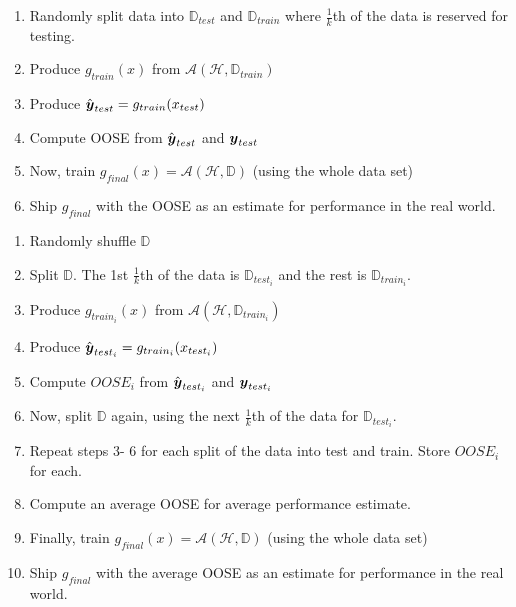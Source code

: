 \documentclass[12pt]{article}
\begin{document}


\begin{enumerate}


\begin{enumerate}[1.]
\item Randomly split data into $\mathbb{D}_{test}$ and $\mathbb{D}_{train}$ where $\frac{1}{k}$th of the data is reserved for testing. 
\item Produce $g_{train}(x)$ from $\mathcal{A}(\mathcal{H}, \mathbb{D}_{train})$
\item Produce $\hat{\boldsymbol{y}}_{test} = g_{train}(x_{test})$ 
\item Compute OOSE from $\hat{\boldsymbol{y}}_{test}$ and $\boldsymbol{y}_{test}$
\item Now, train $g_{final}(x) = \mathcal{A}(\mathcal{H}, \mathbb{D})$ (using the whole data set)
\item Ship $g_{final}$ with the OOSE as an estimate for performance in the real world. 
\end{enumerate}


\begin{enumerate}[1.]
\item Randomly shuffle $\mathbb{D}$
\item Split $\mathbb{D}$. The  1st $\frac{1}{k}$th of the data is $\mathbb{D}_{test_i}$ and the rest is $\mathbb{D}_{train_i}$.  
\item Produce $g_{train_i}(x)$ from $\mathcal{A}(\mathcal{H}, \mathbb{D}_{train_i})$
\item Produce $\hat{\boldsymbol{y}}_{test_i} = g_{train_i}(x_{test_i})$ 
\item Compute $OOSE_{i}$ from $\hat{\boldsymbol{y}}_{test_i}$ and $\boldsymbol{y}_{test_i}$
\item Now, split $\mathbb{D}$ again, using the next $\frac{1}{k}$th of the data for $\mathbb{D}_{test_i}$. 
\item Repeat steps 3- 6 for each split of the data into test and train. Store $OOSE_{i}$ for each.
\item Compute an average OOSE for average performance estimate.
\item Finally, train $g_{final}(x) = \mathcal{A}(\mathcal{H}, \mathbb{D})$ (using the whole data set)
\item Ship $g_{final}$ with the average OOSE as an estimate for performance in the real world. 


\end{enumerate}
\end{enumerate}
\end{document}
